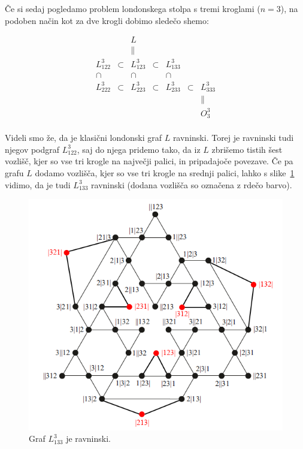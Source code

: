 \documentclass[12pt,a4paper]{amsart}
\theoremstyle{definition} %
\theoremstyle{plain} %
\begin{document}
Če si sedaj pogledamo problem londonskega stolpa s tremi kroglami ($n=3$), na podoben način kot za dve krogli dobimo sledečo shemo:

\begin{equation}
\label{eq:grafi-3krogle}
\begin{matrix}
    & & L & & & & \\
    & & \parallel & & & & \\
    L_{122}^3 & \subset & L_{123}^3 & \subset & L_{133}^3 & & \\
    \cap & & \cap & & \cap & & \\
    L_{222}^3 & \subset & L_{223}^3 & \subset & L_{233}^3 & \subset & L_{333}^3 \\
    & & & & & & \parallel \\
    & & & & & & O^3_3 \\
\end{matrix}
\end{equation}

\smallskip

Videli smo že, da je klasični londonski graf $L$ ravninski. Torej je ravninski tudi njegov podgraf $L_{122}^3$, saj do njega pridemo tako, da iz $L$ zbrišemo tistih šest vozlišč, kjer so vse tri krogle na največji palici, in pripadajoče povezave. 
Če pa grafu $L$ dodamo vozlišča, kjer so vse tri krogle na srednji palici, lahko s slike~\ref{fig:L^3_133} vidimo, da je tudi $L_{133}^3$ ravninski (dodana vozlišča so označena z rdečo barvo).

\begin{figure}[h]
    \includegraphics[width=350pt]{img/graph-L^3_133.png}
    \caption{Graf $L^3_{133}$ je ravninski.}
    \label{fig:L^3_133}
\end{figure}
\end{document}

